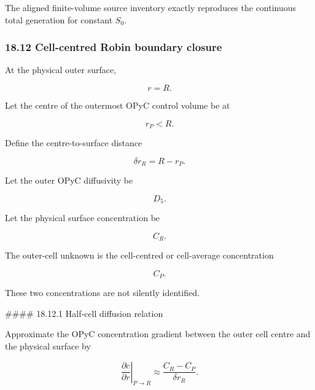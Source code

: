 \documentclass[11pt,a4paper]{article}
\begin{document}
The aligned finite-volume source inventory exactly reproduces the continuous total generation for constant $S_0$.

\subsubsection*{18.12 Cell-centred Robin boundary closure}

At the physical outer surface,

\begin{equation}
r=R.
\tag{TRISO-FV-175}
\label{eq:triso-fv-175}
\end{equation}

Let the centre of the outermost OPyC control volume be at

\begin{equation}
r_P<R.
\tag{TRISO-FV-176}
\label{eq:triso-fv-176}
\end{equation}

Define the centre-to-surface distance

\begin{equation}
\boxed{
\delta r_R=R-r_P.
}
\tag{TRISO-FV-177}
\label{eq:triso-fv-177}
\end{equation}

Let the outer OPyC diffusivity be

\begin{equation}
D_5.
\tag{TRISO-FV-178}
\label{eq:triso-fv-178}
\end{equation}

Let the physical surface concentration be

\begin{equation}
C_R.
\tag{TRISO-FV-179}
\label{eq:triso-fv-179}
\end{equation}

The outer-cell unknown is the cell-centred or cell-average concentration

\begin{equation}
C_P.
\tag{TRISO-FV-180}
\label{eq:triso-fv-180}
\end{equation}

These two concentrations are not silently identified.

\#\#\#\# 18.12.1 Half-cell diffusion relation

Approximate the OPyC concentration gradient between the outer cell centre and the physical surface by

\begin{equation}
\left.
\frac{\partial c}{\partial r}
\right|_{P\rightarrow R}
\approx
\frac{C_R-C_P}{\delta r_R}.
\tag{TRISO-FV-181}
\label{eq:triso-fv-181}
\end{equation}
\end{document}
